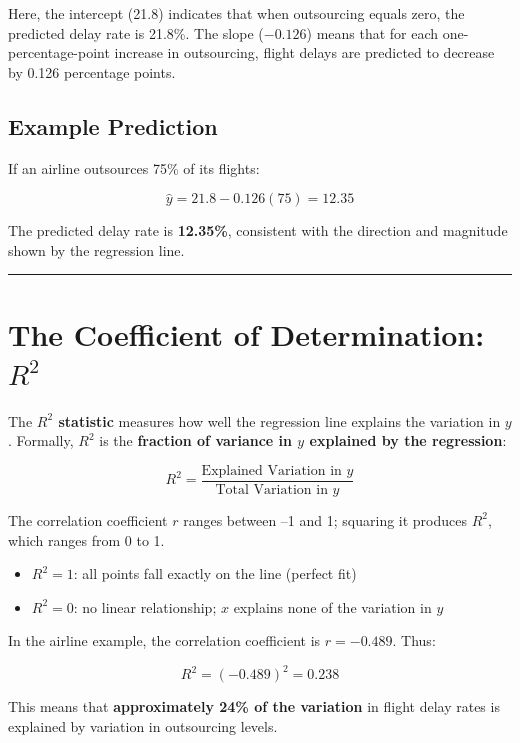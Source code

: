 \documentclass[
  letterpaper,
  DIV=11,
  numbers=noendperiod]{scrreprt}
\providecommand{\tightlist}{%
  \setlength{\itemsep}{0pt}\setlength{\parskip}{0pt}}
\begin{document}
Here, the intercept (21.8) indicates that when outsourcing equals zero,
the predicted delay rate is 21.8\%. The slope (\(-0.126\)) means that
for each one-percentage-point increase in outsourcing, flight delays are
predicted to decrease by 0.126 percentage points.

\subsection{Example Prediction}\label{example-prediction-1}

If an airline outsources 75\% of its flights:

\[
\hat{y} = 21.8 - 0.126(75) = 12.35
\]

The predicted delay rate is \textbf{12.35\%}, consistent with the
direction and magnitude shown by the regression line.

\begin{center}\rule{0.5\linewidth}{0.5pt}\end{center}

\section{\texorpdfstring{The Coefficient of Determination:
\(R^2\)}{The Coefficient of Determination: R\^{}2}}\label{the-coefficient-of-determination-r2}

The \textbf{\(R^2\) statistic} measures how well the regression line
explains the variation in \(y\). Formally, \(R^2\) is the
\textbf{fraction of variance in \(y\) explained by the regression}:

\[
R^2 = \frac{\text{Explained Variation in } y}{\text{Total Variation in } y}
\]

The correlation coefficient \(r\) ranges between --1 and 1; squaring it
produces \(R^2\), which ranges from 0 to 1.

\begin{itemize}
\tightlist
\item
  \(R^2 = 1\): all points fall exactly on the line (perfect fit)\\
\item
  \(R^2 = 0\): no linear relationship; \(x\) explains none of the
  variation in \(y\)
\end{itemize}

In the airline example, the correlation coefficient is \(r = -0.489\).
Thus:

\[
R^2 = (-0.489)^2 = 0.238
\]

This means that \textbf{approximately 24\% of the variation} in flight
delay rates is explained by variation in outsourcing levels.
\end{document}

